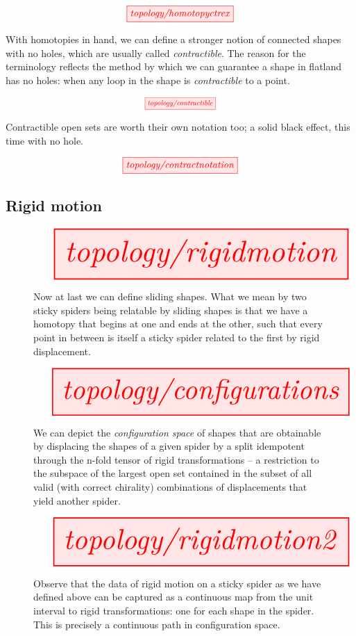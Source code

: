 \[\tikzfig{topology/homotopyctrex}\]


With homotopies in hand, we can define a stronger notion of connected shapes with no holes, which are usually called \emph{contractible}. The reason for the terminology reflects the method by which we can guarantee a shape in flatland has no holes: when any loop in the shape is \emph{contractible} to a point.

\[\scalebox{0.75}{\tikzfig{topology/contractible}}\]

Contractible open sets are worth their own notation too; a solid black effect, this time with no hole.

\[\tikzfig{topology/contractnotation}\]

\subsection{Rigid motion}\label{sec:rigidmotion}

\begin{figure}[h!]
\centering
\[\resizebox{\textwidth}{!}{\tikzfig{topology/rigidmotion}}\]
\caption{Now at last we can define sliding shapes. What we mean by two sticky spiders being relatable by sliding shapes is that we have a homotopy that begins at one and ends at the other, such that every point in between is itself a sticky spider related to the first by rigid displacement.}
\end{figure}


\begin{figure}[h!]
\centering
\[\resizebox{\textwidth}{!}{\tikzfig{topology/configurations}}\]
\caption{We can depict the \emph{configuration space} of shapes that are obtainable by displacing the shapes of a given spider by a split idempotent through the n-fold tensor of rigid transformations -- a restriction to the subspace of the largest open set contained in the subset of all valid (with correct chirality) combinations of displacements that yield another spider.}
\end{figure}

\begin{figure}[h!]
\centering
\[\resizebox{\textwidth}{!}{\tikzfig{topology/rigidmotion2}}\]
\caption{Observe that the data of rigid motion on a sticky spider as we have defined above can be captured as a continuous map from the unit interval to rigid transformations: one for each shape in the spider. This is precisely a continuous path in configuration space.}
\end{figure}

